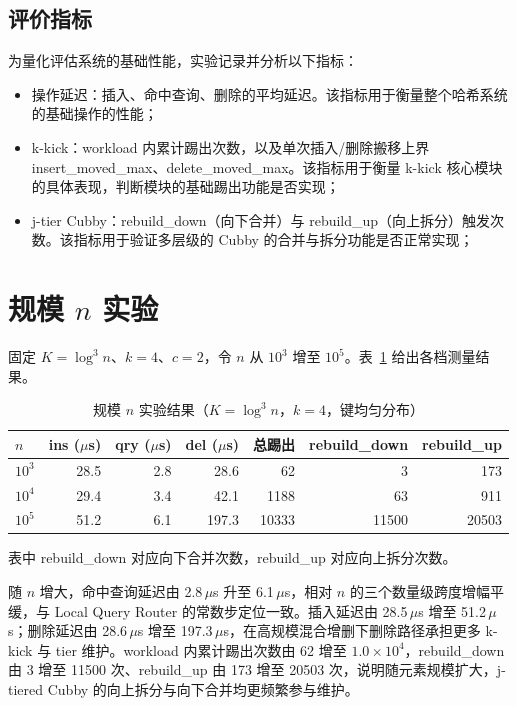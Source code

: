 \subsection{评价指标}

为量化评估系统的基础性能，实验记录并分析以下指标：

\begin{itemize}
  \item 操作延迟：插入、命中查询、删除的平均延迟。该指标用于衡量整个哈希系统的基础操作的性能；
  \item k-kick：workload 内累计踢出次数，以及单次插入/删除搬移上界 insert\_moved\_max、delete\_moved\_max。该指标用于衡量 k-kick 核心模块的具体表现，判断模块的基础踢出功能是否实现；
  \item j-tier Cubby：rebuild\_down（向下合并）与 rebuild\_up（向上拆分）触发次数。该指标用于验证多层级的 Cubby 的合并与拆分功能是否正常实现；
\end{itemize}

\section{规模 \texorpdfstring{$n$}{n} 实验}

固定 \(K=\log^3 n\)、\(k=4\)、\(c=2\)，令 \(n\) 从 \(10^3\) 增至 \(10^5\)。表~\ref{tab:exp-n-fixed} 给出各档测量结果。

\begin{table}[htbp]
  \centering
  \caption{规模 \(n\) 实验结果（\(K=\log^3 n\)，\(k=4\)，键均匀分布）}
  \label{tab:exp-n-fixed}
  \footnotesize
  \begin{tabular}{lrrrrrr}
    \toprule
    $n$ &
    ins ($\mu$s) & qry ($\mu$s) & del ($\mu$s) &
    总踢出 & rebuild\_down & rebuild\_up \\
    \midrule
    $10^3$  & 28.5 & 2.8  & 28.6 & 62     & 3     & 173   \\
    $10^4$  & 29.4 & 3.4  & 42.1 & 1188   & 63    & 911   \\
    $10^5$  & 51.2 & 6.1  & 197.3 & 10333 & 11500 & 20503 \\
    \bottomrule
  \end{tabular}
\end{table}

\noindent 表中 rebuild\_down 对应向下合并次数，rebuild\_up 对应向上拆分次数。

随 \(n\) 增大，命中查询延迟由 2.8\,$\mu$s 升至 6.1\,$\mu$s，相对 \(n\) 的三个数量级跨度增幅平缓，与 Local Query Router 的常数步定位一致\cite{bender2022otsh,morrison1968}。插入延迟由 28.5\,$\mu$s 增至 51.2\,$\mu$s；删除延迟由 28.6\,$\mu$s 增至 197.3\,$\mu$s，在高规模混合增删下删除路径承担更多 k-kick 与 tier 维护。workload 内累计踢出次数由 62 增至 \(1.0\times 10^4\)，rebuild\_down 由 3 增至 11500 次、rebuild\_up 由 173 增至 20503 次，说明随元素规模扩大，j-tiered Cubby 的向上拆分与向下合并均更频繁参与维护\cite{bender2024iceberg,pandey2023iceberght}。

